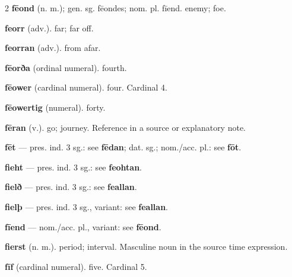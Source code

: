 \begin{multicols*}{2}
\textbf{fēond} (n. m.); gen. sg. fēondes; nom. pl. fīend. enemy; foe.\par
\textbf{feorr} (adv.). far; far off.\par
\textbf{feorran} (adv.). from afar.\par
\textbf{fēorða} (ordinal numeral). fourth.\par
\textbf{fēower} (cardinal numeral). four. Cardinal 4.\par
\textbf{fēowertig} (numeral). forty.\par
\textbf{fēran} (v.). go; journey. Reference in a source or explanatory note.\par
\textbf{fēt} — pres. ind. 3 sg.: see \textbf{fēdan}; dat. sg.; nom./acc. pl.: see \textbf{fōt}.\par
\textbf{fieht} — pres. ind. 3 sg.: see \textbf{feohtan}.\par
\textbf{fielð} — pres. ind. 3 sg.: see \textbf{feallan}.\par
\textbf{fielþ} — pres. ind. 3 sg., variant: see \textbf{feallan}.\par
\textbf{fīend} — nom./acc. pl., variant: see \textbf{fēond}.\par
\textbf{fierst} (n. m.). period; interval. Masculine noun in the source time expression.\par
\textbf{fīf} (cardinal numeral). five. Cardinal 5.\par

\end{multicols*}
